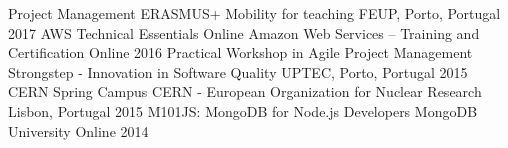 \begin{cvhonors}
  \cvhonor
    {Project Management}
    {ERASMUS+ Mobility for teaching}
    {FEUP, Porto, Portugal}
    {2017}
  \cvhonor
    {AWS Technical Essentials Online}
    {Amazon Web Services -- Training and Certification}
    {Online}
    {2016}
  \cvhonor
    {Practical Workshop in Agile Project Management}
    {Strongstep - Innovation in Software Quality}
    {UPTEC, Porto, Portugal}
    {2015}
  \cvhonor
    {CERN Spring Campus}
    {CERN - European Organization for Nuclear Research}
    {Lisbon, Portugal}
    {2015}
  \cvhonor
    {M101JS: MongoDB for Node.js Developers}
    {MongoDB University}
    {Online}
    {2014}  
\end{cvhonors}
